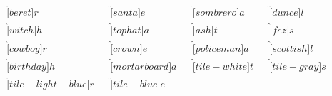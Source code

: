 \documentclass{article}
\begin{document}
\vspace*{-9mm}
\begin{align*}
\hat[beret]{r}&&
\hat[santa]{e}&&
\hat[sombrero]{a}&&
\hat[dunce]{l}\\
\hat[witch]{h}&&
\hat[tophat]{a}&&
\hat[ash]{t}&&
\hat[fez]{s}\\
\hat[cowboy]{r}&&
\hat[crown]{e}&&
\hat[policeman]{a}&&
\hat[scottish]{l}\\
\hat[birthday]{h}&&
\hat[mortarboard]{a}&&
\hat[tile-white]{t}&&
\hat[tile-gray]{s}\\
\hat[tile-light-blue]{r}&&
\hat[tile-blue]{e}
\end{align*}
\end{document}
